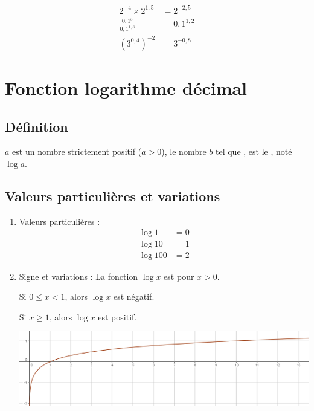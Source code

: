 \documentclass[12pt,a4paper]{article}
\begin{document}
\begin{myex}
	
	\begin{align*}
		2^{-4} \times 2^{1,5} &= 2^{-2,5}\\
		\frac{0,1^3}{0,1^{1,8}} &= 0,1^{1,2}\\
		(3^{0,4})^{-2} &= 3^{-0,8}
	\end{align*}
\end{myex}

\newpage

\section{Fonction logarithme décimal}

\subsection{Définition}

\begin{mydef}
	$a$ est un nombre strictement positif ($a>0$), le nombre $b$ tel que , est le , noté $\log a$.
\end{mydef}

\subsection{Valeurs particulières et variations}

\begin{myprops}
	\begin{enumerate}
		\item Valeurs particulières :
			\begin{align*}
				\log 1 &= 0 \\
				\log 10 &= 1\\
				\log 100 &= 2
			\end{align*}
	
		\item Signe et variations :
			La fonction $\log x$ est  pour $x > 0$.
			
			 Si $0 \leq x < 1$, alors $\log x$ est négatif.
			 
			 Si $x \geq 1$, alors $\log x$ est positif.
			\begin{center}
				\includegraphics[scale = 0.35]{./img/var_log}
			\end{center}	
	\end{enumerate}
	
	
\end{myprops}
\end{document}
